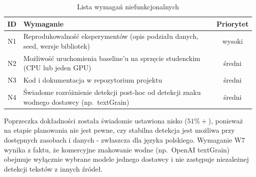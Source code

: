 \begin{table}[H]
\centering
\small
\begin{tabularx}{\textwidth}{|c|X|c|}
\hline
\textbf{ID} & \textbf{Wymaganie} & \textbf{Priorytet} \\
\hline
N1 & Reprodukowalność eksperymentów (opis podziału danych, seed, wersje bibliotek) & wysoki \\
\hline
N2 & Możliwość uruchomienia baseline'u na sprzęcie studenckim (CPU lub jeden GPU) & średni \\
\hline
N3 & Kod i dokumentacja w repozytorium projektu & średni \\
\hline
N4 & Świadome rozróżnienie detekcji post-hoc od detekcji znaku wodnego dostawcy (np.\ textGrain) & średni \\
\hline
\end{tabularx}
\caption{Lista wymagań niefunkcjonalnych}
\end{table}

Poprzeczka dokładności została świadomie ustawiona nisko ($51\%+$), ponieważ na etapie planowania nie jest pewne, czy stabilna detekcja jest możliwa przy dostępnych zasobach i danych - zwłaszcza dla języka polskiego. Wymaganie W7 wynika z faktu, że komercyjne znakowanie wodne (np.\ OpenAI textGrain) obejmuje wyłącznie wybrane modele jednego dostawcy i nie zastępuje niezależnej detekcji tekstów z innych źródeł.
